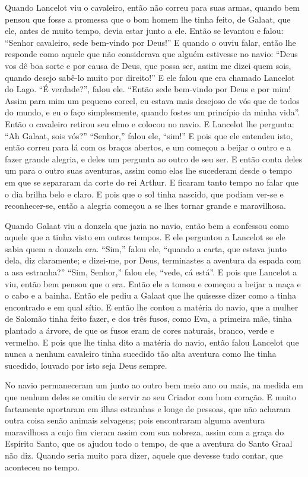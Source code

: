 Quando Lancelot viu o cavaleiro, então não correu para suas armas, quando bem
pensou que fosse a promessa que o bom homem lhe tinha feito, de Galaat, que
ele, antes de muito tempo, devia estar junto a ele. Então se levantou e falou:
“Senhor cavaleiro, sede bem-vindo por Deus!” E quando o ouviu falar, então lhe
responde como aquele que não considerava que alguém estivesse no navio: “Deus
vos dê boa sorte e por causa de Deus, que possa ser, assim me dizei quem sois,
quando desejo sabê-lo muito por direito!” E ele falou que era chamado
Lancelot do Lago. “É verdade?”, falou ele. “Então sede bem-vindo por Deus e
por mim! Assim para mim um pequeno corcel, eu estava mais desejoso de vós que
de todos do mundo, e eu o faço simplesmente, quando fostes um princípio da
minha vida”. Então o cavaleiro retirou seu elmo e colocou no navio. E Lancelot
lhe pergunta: “Ah Galaat, sois vós?” “Senhor,” falou ele, “sim!” E pois que
ele entendeu isto, então correu para lá com os braços abertos, e um começou a
beijar o outro e a fazer grande alegria, e deles um pergunta ao outro de seu
ser. E então conta deles um para o outro suas aventuras, assim como elas lhe
sucederam desde o tempo em que se separaram da corte do rei Arthur. E ficaram
tanto tempo no falar que o dia brilha belo e claro. E pois que o sol tinha
nascido, que podiam ver-se e reconhecer-se, então a alegria começou a se lhes
tornar grande e maravilhosa.

Quando Galaat viu a donzela que jazia no navio, então bem a confessou como
aquele que a tinha visto em outros tempos. E ele perguntou a Lancelot se ele
sabia quem a donzela era. “Sim,” falou ele, “quando a carta, que estava junto
dela, diz claramente; e dizei-me, por Deus, terminastes a aventura da espada
com a asa estranha?” “Sim, Senhor,” falou ele, “vede, cá está”. E pois que
Lancelot a viu, então bem pensou que o era. Então ele a tomou e começou a
beijar a maça e o cabo e a bainha. Então ele pediu a Galaat que lhe quisesse
dizer como a tinha encontrado e em qual sítio. E então lhe contou a matéria do
navio, que a mulher de Salomão tinha feito fazer, e dos três fusos, como Eva, a
primeira mãe, tinha plantado a árvore, de que os fusos eram de cores naturais,
branco, verde e vermelho. E pois que lhe tinha dito a matéria do navio, então
falou Lancelot que nunca a nenhum cavaleiro tinha sucedido tão alta aventura
como lhe tinha sucedido, louvado por isto seja Deus sempre. 

No navio permaneceram um junto ao outro bem meio ano ou mais, na medida em que
nenhum deles se omitiu de servir ao seu Criador com bom coração. E muito
fartamente aportaram em ilhas estranhas e longe de pessoas, que não acharam
outra coisa senão animais selvagens; pois encontraram alguma aventura
maravilhosa a cujo fim vieram assim com sua nobreza, assim com a graça do
Espírito Santo, que os ajudou todo o tempo, de que a aventura do Santo Graal
não diz. Quando seria muito para dizer, aquele que devesse tudo contar, que
aconteceu no tempo. 

